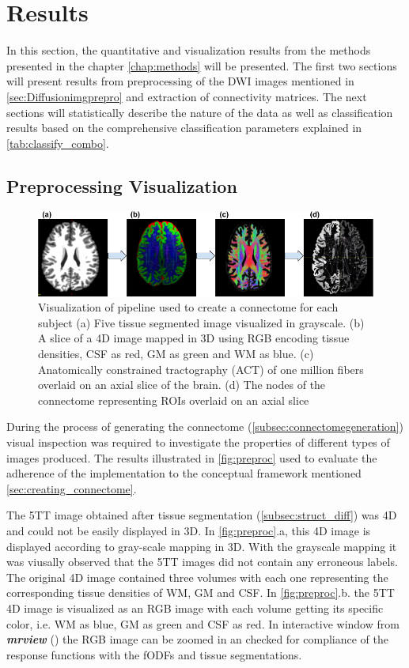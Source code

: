 \documentclass[msthesis.tex]{subfiles}
\begin{document}
\chapter{Results}
In this section, the quantitative and visualization results from the methods presented in the chapter \ref{chap:methods} will be presented. The first two sections will present results from preprocessing of the DWI images mentioned in \autoref{sec:Diffusionimgprepro} and extraction of connectivity matrices. The next sections will statistically describe the nature of the data as well as classification results based on the comprehensive classification parameters explained in \autoref{tab:classify_combo}.

\section{Preprocessing Visualization}
\begin{figure}
    \centering
    \includegraphics[width=\textwidth]{images/Preprocessing_pipeline.png}
    \caption{Visualization of pipeline used to create a connectome for each subject (a) Five tissue segmented image visualized in grayscale. (b) A slice of a 4D image mapped in 3D using RGB encoding tissue densities, CSF as red, GM as green and WM as blue. (c) Anatomically constrained tractography (ACT) of one million fibers overlaid on an axial slice of the brain. (d) The nodes of the connectome representing ROIs overlaid on an axial slice}
    \label{fig:preproc}
\end{figure}

During the process of generating the connectome (\autoref{subsec:connectomegeneration}) visual inspection was required to investigate the properties of different types of images produced. The results illustrated in \autoref{fig:preproc} used to evaluate the adherence of the implementation to the conceptual framework mentioned \autoref{sec:creating_connectome}. 

The 5TT image obtained after tissue segmentation (\autoref{subsec:struct_diff}) was 4D and could not be easily displayed in 3D. In \autoref{fig:preproc}.a, this 4D image is displayed according to gray-scale mapping in 3D. With the grayscale mapping it was viusally observed that the 5TT images did not contain any erroneous labels. The original 4D image contained three volumes with each one representing the corresponding tissue densities of WM, GM and CSF. In \autoref{fig:preproc}.b. the 5TT 4D image is visualized as an RGB image with each volume getting its specific color, i.e. WM as blue, GM as green and CSF as red. In interactive window from \textbf{\textit{mrview}} (\cite{tournier2019mrtrix3}) the RGB image can be zoomed in an checked for compliance of the response functions with the fODFs and tissue segmentations. 
\end{document}
